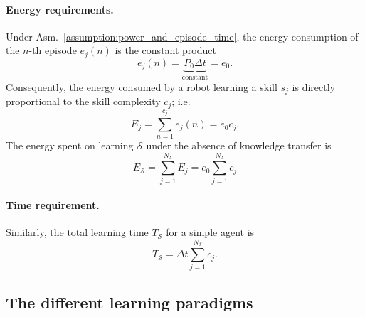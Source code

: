 \paragraph{Energy requirements.}
Under Asm.~\ref{assumption:power_and_episode_time}, the energy consumption of the $n$-th episode $e_j(n)$ is the constant product
\begin{equation}\label{eq:energy_per_episode}
	e_j(n) = \underbrace{P_0 \Delta t}_{\text{constant}} = e_0.
\end{equation}
Consequently, the energy consumed by a robot learning a skill $ s_j $ is directly proportional to the skill complexity $c_j$; i.e.
\begin{equation}\label{eq:energy_per_skill}
	E_j =\sum_{n=1}^{c_j} e_j(n) = e_0c_j.
\end{equation}
The energy spent on learning $\mathcal{S}$ under the absence of knowledge transfer is
\begin{equation}\label{eq:total_energy}
	E_{\mathcal{S}} = \sum_{j=1}^{{N_{\mathcal{S}}}} E_j = e_0 \sum_{j=1}^{{N_{\mathcal{S}}}} c_j%
\end{equation}
\paragraph{Time requirement.} Similarly, the total learning time $T_{\mathcal{S}}$ for a simple agent is
\begin{equation}\label{eq:total_time}
	T_{\mathcal{S}} = \Delta t \sum_{j=1}^{{N_{\mathcal{S}}}} c_j.
\end{equation}

\subsection{The different learning paradigms}\label{sec:types_of_learning}

